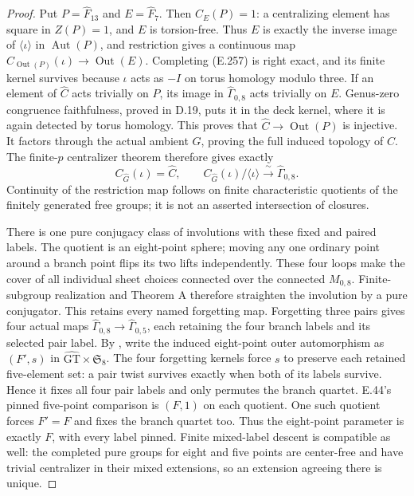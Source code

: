 \begin{proof}
Put $P=\widehat F_{13}$ and $E=\widehat F_7$.
Then $C_E(P)=1$: a centralizing element has square in
$Z(P)=1$, and $E$ is torsion-free.  Thus $E$ is exactly the
inverse image of $\langle\iota\rangle$ in
$\operatorname{Aut}(P)$, and restriction gives a continuous
map $C_{\operatorname{Out}(P)}(\iota)\to
\operatorname{Out}(E)$.
Completing (E.257) is right exact, and its finite kernel
survives because $\iota$ acts as $-I$ on torus homology
modulo three.  If an element of $\widehat C$ acts trivially
on $P$, its image in $\widehat\Gamma_{0,8}$ acts trivially
on $E$.  Genus-zero congruence faithfulness, proved in D.19,
puts it in the deck kernel, where it is again detected by
torus homology.  This proves that
$\widehat C\to\operatorname{Out}(P)$ is injective.
It factors through the actual ambient $\widehat G$, proving
the full induced topology of $C$.  The finite-$p$ centralizer
theorem therefore gives exactly
\[
 C_{\widehat G}(\iota)=\widehat C,
 \qquad
 C_{\widehat G}(\iota)/\langle\iota\rangle
       \xrightarrow{\ \sim\ }\widehat\Gamma_{0,8}.
                                                               \tag{E.258}
\]
Continuity of the restriction map follows on finite
characteristic quotients of the finitely generated free
groups; it is not an asserted intersection of closures.

There is one pure conjugacy class of involutions with these
fixed and paired labels.  The quotient is an eight-point
sphere; moving any one ordinary point around a branch point
flips its two lifts independently.  These four loops make
the cover of all individual sheet choices connected over
the connected $M_{0,8}$.  Finite-subgroup realization and
Theorem A therefore straighten the involution by a pure
conjugator.  This retains every named forgetting map.
Forgetting three pairs gives four actual maps
$\widehat\Gamma_{0,8}\to\widehat\Gamma_{0,5}$, each
retaining the four branch labels and its selected pair label.
By \cite[Corollary 2.8]{ET_HMM2022}, write the induced
eight-point outer automorphism as $(F',s)$ in
$\widehat{\mathrm{GT}}\times\mathfrak S_8$.
The four forgetting kernels force $s$ to preserve each
retained five-element set: a pair twist survives exactly
when both of its labels survive.  Hence it fixes all four
pair labels and only permutes the branch quartet.
E.44's pinned five-point comparison is $(F,1)$ on each
quotient.  One such quotient forces $F'=F$ and fixes the
branch quartet too.  Thus the eight-point parameter is
exactly $F$, with every label pinned.
Finite mixed-label descent is compatible as well: the
completed pure groups for eight and five points are
center-free and have trivial centralizer in their mixed
extensions, so an extension agreeing there is unique.


\end{proof}
